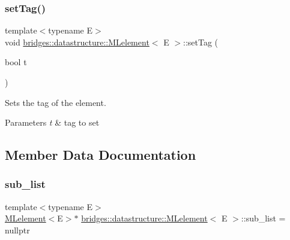 \subsubsection{\texorpdfstring{set\+Tag()}{setTag()}}
{\footnotesize\ttfamily template$<$typename E$>$ \\
void \hyperlink{classbridges_1_1datastructure_1_1_m_lelement}{bridges\+::datastructure\+::\+M\+Lelement}$<$ E $>$\+::set\+Tag (\begin{DoxyParamCaption}\item[{bool}]{t }\end{DoxyParamCaption})\hspace{0.3cm}{\ttfamily [inline]}}



Sets the tag of the element. 


\begin{DoxyParams}{Parameters}
{\em t} & tag to set \\
\hline
\end{DoxyParams}


\subsection{Member Data Documentation}
\mbox{\label{classbridges_1_1datastructure_1_1_m_lelement_afe31ff363c0861efb8eacc12f2a651df}} 
\subsubsection{\texorpdfstring{sub\+\_\+list}{sub\_list}}
{\footnotesize\ttfamily template$<$typename E$>$ \\
\hyperlink{classbridges_1_1datastructure_1_1_m_lelement}{M\+Lelement}$<$E$>$$\ast$ \hyperlink{classbridges_1_1datastructure_1_1_m_lelement}{bridges\+::datastructure\+::\+M\+Lelement}$<$ E $>$\+::sub\+\_\+list = nullptr\hspace{0.3cm}{\ttfamily [protected]}}

\mbox{\label{classbridges_1_1datastructure_1_1_m_lelement_aef061a364a85ebb0c0f2cdaff8c726e6}} 
